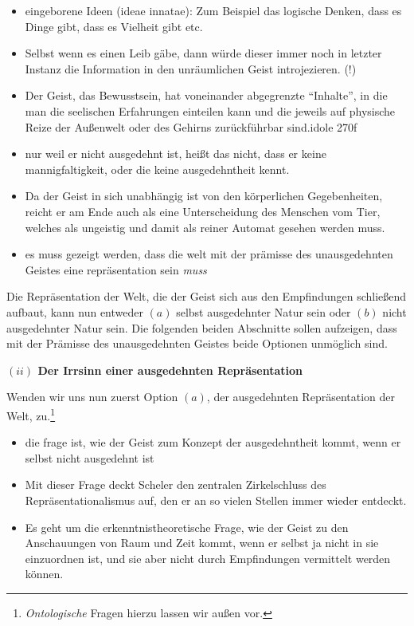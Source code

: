 \documentclass[a4paper, 12pt]{article}
\begin{document}
\begin{onehalfspace}
\begin{itemize}
  \item eingeborene Ideen (ideae innatae): Zum Beispiel das logische Denken, dass es Dinge gibt, dass es Vielheit gibt etc.
  \item Selbst wenn es einen Leib gäbe, dann würde dieser immer noch in letzter Instanz die Information in den unräumlichen Geist introjezieren. (!)
  \item Der Geist, das Bewusstsein, hat voneinander abgegrenzte "`Inhalte"', in die man die seelischen Erfahrungen einteilen kann und die jeweils auf physische Reize der Außenwelt oder des Gehirns zurückführbar sind.idole 270f
  \item nur weil er nicht ausgedehnt ist, heißt das nicht, dass er keine mannigfaltigkeit, oder die keine ausgedehntheit kennt.
  \item Da der Geist in sich unabhängig ist von den körperlichen Gegebenheiten, reicht er am Ende auch als eine Unterscheidung des Menschen vom Tier, welches als ungeistig und damit als reiner Automat gesehen werden muss.
  \item es muss gezeigt werden, dass die welt mit der prämisse des unausgedehnten Geistes eine repräsentation sein \emph{muss}
\end{itemize}


Die Repräsentation der Welt, die der Geist sich aus den Empfindungen schließend aufbaut, kann nun entweder $(a)$ selbst ausgedehnter Natur sein oder $(b)$ nicht ausgedehnter Natur sein. Die folgenden beiden Abschnitte sollen aufzeigen, dass mit der Prämisse des unausgedehnten Geistes beide Optionen unmöglich sind.

\vspace{5mm}
\noindent\textbf{$(ii)$ Der Irrsinn einer ausgedehnten Repräsentation}


\noindent Wenden wir uns nun zuerst Option $(a)$, der ausgedehnten Repräsentation der Welt, zu.\footnote{\emph{Ontologische} Fragen hierzu lassen wir außen vor.} 

\begin{itemize}
  \item die frage ist, wie der Geist zum Konzept der ausgedehntheit kommt, wenn er selbst nicht ausgedehnt ist
  \item Mit dieser Frage deckt Scheler den zentralen Zirkelschluss des Repräsentationalismus auf, den er an so vielen Stellen immer wieder entdeckt.
  \item Es geht um die erkenntnistheoretische Frage, wie der Geist zu den Anschauungen von Raum und Zeit kommt, wenn er selbst ja nicht in sie einzuordnen ist, und sie aber nicht durch Empfindungen vermittelt werden können.
\end{itemize}




\end{onehalfspace}
\end{document}
